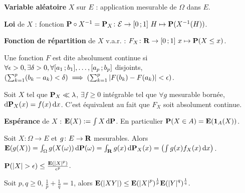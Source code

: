 \begin{defn}
	\textbf{Variable aléatoire} $X$ sur $E$ : application mesurable de $\Omega$ dans $E$.
\end{defn}

\begin{defn}
	\textbf{Loi} de $X$ : fonction $\mathbf{P} \circ X^{-1} = \mathbf{P}_X \colon \mathcal{E} \to \mathopen{}\mathclose{\left[0\mathclose{}\mathpunct{};1\right]} \ H \mapsto \mathbf{P}(X^{-1}(H))$.
\end{defn}

\begin{defn}
	\textbf{Fonction de répartition} de $X$ v.a.r. : $F_X \colon \mathbf{R} \to \mathopen{}\mathclose{\left[0\mathclose{}\mathpunct{};1\right]} \ x \mapsto \mathbf{P}(X \leq x)$.
\end{defn}

\begin{defn}
	Une fonction $F$ est dite absolument continue si $\forall \epsilon > 0, \exists \delta > 0, \forall \mathopen{}\mathclose{\left[a_1\mathclose{}\mathpunct{};b_1\right]},\ldots,\mathopen{}\mathclose{\left[a_p\mathclose{}\mathpunct{};b_p\right]}$ disjoints,\\
	$\left( \sum_{k = 1}^p (b_k - a_k) < \delta \right) \implies \left( \sum_{k = 1}^p \left\lvert F(b_k) - F(a_k)\right\rvert < \epsilon \right)$.
\end{defn}

\begin{thm}
	Soit $X$ tel que $\mathbf{P}_X \ll \lambda$, $\exists f \geq 0$ intégrable tel que $\forall g$ mesurable bornée, $\mathop{}\mathopen{}\mathrm{d} \mathbf{P}_X(x) = f(x) \mathop{}\mathopen{}\mathrm{d} x$.
	C'est équivalent au fait que $F_X$ soit absolument continue.
\end{thm}

\begin{defn}
	\textbf{Espérance} de $X$ : $\mathbf{E}(X) := \int X \mathop{}\mathopen{}\mathrm{d} \mathbf{P}$. En particulier $\mathbf{P}(X \in A) = \mathbf{E}(\operatorname{\mathbf{1}}_A(X))$.
\end{defn}

\begin{thm}
	Soit $X \colon \Omega \to E$ et $g \colon E \to \mathbf{R}$ mesurables. Alors $\mathbf{E}(g(X)) = \int_{\Omega} g(X(\omega)) \mathop{}\mathopen{}\mathrm{d} \mathbf{P}(\omega) = \int_{\mathbf{R}} g(x) \mathop{}\mathopen{}\mathrm{d} \mathbf{P}_X(x) = \left( \int g(x) f_X(x) \mathop{}\mathopen{}\mathrm{d} x \right)$.
\end{thm}

\begin{thm}
	$\mathbf{P}(\left\lvert X\right\rvert > \epsilon) \leq \frac{\mathbf{E}(\left\lvert X\right\rvert^p)}{\epsilon^p}$.
\end{thm}

\begin{thm}
	Soit $p, q \geq 0$, $\frac{1}{p} + \frac{1}{q} = 1$, alors
	$\mathbf{E}(\left\lvert XY\right\rvert) \leq \mathbf{E}(\left\lvert X\right\rvert^p)^{\frac{1}{p}} \mathbf{E}(\left\lvert Y\right\rvert^q)^{\frac{1}{q}}$.
\end{thm}

